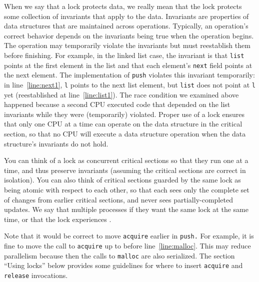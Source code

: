 When we say that a lock protects data, we really mean
that the lock protects some collection of invariants
that apply to the data.
Invariants are properties of data structures that
are maintained across operations.
Typically, an operation's correct behavior depends
on the invariants being true when the operation
begins.  The operation may temporarily violate
the invariants but must reestablish them before
finishing.
For example, in the linked list case, the invariant is that
\lstinline{list}
points at the first element in the list
and that each element's
\lstinline{next}
field points at the next element.
The implementation of
\lstinline{push}
violates this invariant temporarily: in line~\ref{line:next1},
\lstinline{l}
points
to the next list element, but
\lstinline{list}
does not point at
\lstinline{l}
yet (reestablished at line~\ref{line:list1}).
The race condition we examined above
happened because a second CPU executed
code that depended on the list invariants
while they were (temporarily) violated.
Proper use of a lock ensures that only one CPU at a time
can operate on the data structure in the critical section, so that
no CPU will execute a data structure operation when the 
data structure's invariants do not hold.

You can think of a lock as
concurrent critical sections so that they run one at a time,
and thus preserve invariants (assuming the critical sections
are correct in isolation).
You can also think of critical sections guarded by the same lock as being
atomic with respect to each other,
so that each sees only the complete set of
changes from earlier critical sections, and never sees
partially-completed updates.
We say that multiple processes  if they
want the same lock at the same time, or that the
lock experiences .

Note that it would be correct to move
\lstinline{acquire}
earlier in
\lstinline{push.}
For example, it is fine to move the call to
\lstinline{acquire}
up to before line~\ref{line:malloc}.
This may reduce parallelism because then the calls
to
\lstinline{malloc}
are also serialized.
The section ``Using locks'' below provides some guidelines for where to insert
\lstinline{acquire}
and
\lstinline{release}
invocations.
